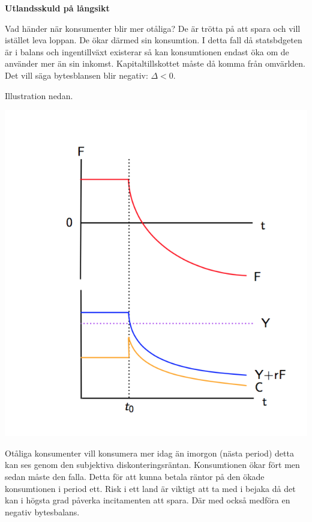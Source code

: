 \documentclass{article}
\begin{document}
\vspace{5mm} \par \noindent 
\textbf{Utlandsskuld på långsikt}
\vspace{5mm} \par \noindent 

Vad händer när konsumenter blir mer otåliga? De är trötta på att spara och vill istället leva loppan. De ökar därmed sin konsumtion. I detta fall då statsbdgeten är i balans och ingentillväxt existerar så kan konsumtionen endast öka om de använder mer än sin inkomst. Kapitaltillskottet måste då komma från omvärlden. Det vill säga bytesblansen blir negativ: $ \Delta < 0 $. 

Illustration nedan.

\includegraphics[scale=0.6]{skarm15}

\vspace{5mm} \par \noindent 

Otåliga konsumenter vill konsumera mer idag än imorgon (nästa period) detta kan ses genom den subjektiva diskonteringsräntan. Konsumtionen ökar fört men sedan måste den falla. Detta för att kunna betala räntor på den ökade konsumtionen i period ett. Risk i ett land är viktigt att ta med i bejaka då det kan i högsta grad påverka incitamenten att spara. Där med också medföra en negativ bytesbalans. 
\end{document}
